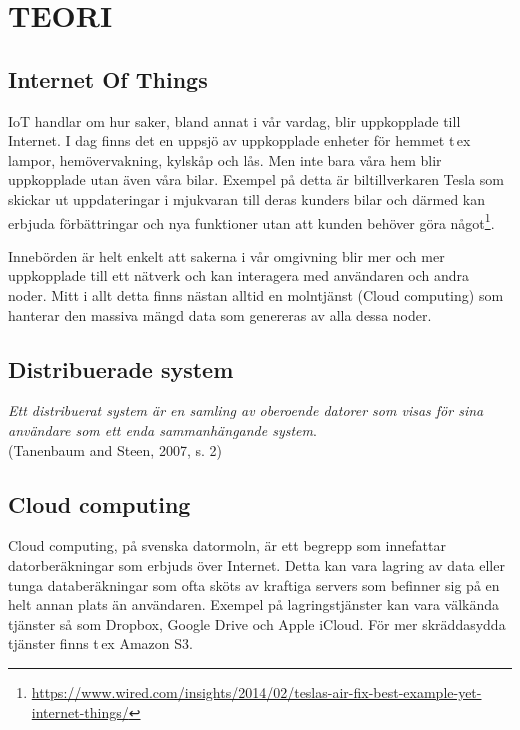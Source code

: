 \chapter{TEORI}
\thispagestyle{fancy}

\section{Internet Of Things}
\ac{IoT} handlar om hur saker, bland annat i vår vardag, blir uppkopplade till Internet. I dag finns det en uppsjö av uppkopplade enheter för hemmet t\,ex lampor, hemövervakning, kylskåp och lås. Men inte bara våra hem blir uppkopplade utan även våra bilar. Exempel på detta är biltillverkaren Tesla som skickar ut uppdateringar i mjukvaran till deras kunders bilar och därmed kan erbjuda förbättringar och nya funktioner utan att kunden behöver göra något\footnote{\url{https://www.wired.com/insights/2014/02/teslas-air-fix-best-example-yet-internet-things/}}.

Innebörden är helt enkelt att sakerna i vår omgivning blir mer och mer uppkopplade till ett nätverk och kan interagera med användaren och andra noder. Mitt i allt detta finns nästan alltid en molntjänst (Cloud computing) som hanterar den massiva mängd data som genereras av alla dessa noder.

\section{Distribuerade system}
\begin{displayquote} \emph{Ett distribuerat system är en samling av oberoende datorer som visas för sina användare som ett enda sammanhängande system}.\\(Tanenbaum and Steen, 2007, s. 2)\cite{Tanenbaum}

\end{displayquote}

\section{Cloud computing}
Cloud computing, på svenska datormoln, är ett begrepp som innefattar datorberäkningar som erbjuds över Internet. Detta kan vara lagring av data eller tunga databeräkningar som ofta sköts av kraftiga servers som befinner sig på en helt annan plats än användaren. Exempel på lagringstjänster kan vara välkända tjänster så som Dropbox, Google Drive och Apple iCloud. För mer skräddasydda tjänster finns t\,ex Amazon S3.

